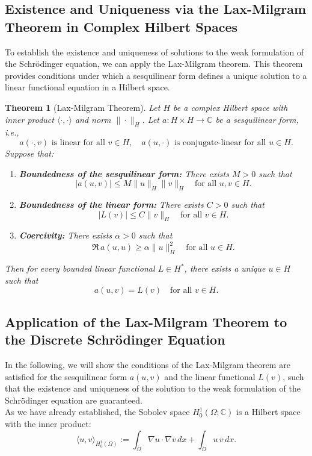 \documentclass{article}
\theoremstyle{definition}
\theoremstyle{plain}
\newtheorem{theorem}[definition]{Theorem}
\theoremstyle{remark}
\begin{document}
\subsection*{Existence and Uniqueness via the Lax-Milgram Theorem in Complex Hilbert Spaces}
To establish the existence and uniqueness of solutions to the weak formulation of the Schrödinger equation, we can apply the Lax-Milgram theorem. 
This theorem provides conditions under which a sesquilinear form defines a unique solution to a linear functional equation in a Hilbert space.
\begin{theorem}
[Lax-Milgram Theorem]
Let $H$ be a complex Hilbert space with inner product $\langle \cdot, \cdot \rangle$ and norm $\| \cdot \|_H$. Let $a : H \times H \to \mathbb{C}$ be a sesquilinear form, i.e.,
\[
a(\cdot, v) \text{ is linear for all } v \in H, \quad a(u, \cdot) \text{ is conjugate-linear for all } u \in H.
\]
Suppose that:
\begin{enumerate}
    \item \textbf{Boundedness of the sesquilinear form:} There exists $M > 0$ such that
    \[
    |a(u, v)| \leq M \|u\|_H \|v\|_H \quad \text{for all } u, v \in H.
    \]
    \item \textbf{Boundedness of the linear form:} There exists $C > 0$ such that
    \[
    |L(v)| \leq C \|v\|_H \quad \text{for all } v \in H.
    \]
    \item \textbf{Coercivity:} There exists $\alpha > 0$ such that
    \[
    \Re \, a(u, u) \geq \alpha \|u\|_H^2 \quad \text{for all } u \in H.
    \]
\end{enumerate}
Then for every bounded linear functional $L \in H^*$, there exists a unique $u \in H$ such that
\[
a(u, v) = L(v) \quad \text{for all } v \in H.
\]
\end{theorem}


\subsection*{Application of the Lax-Milgram Theorem to the Discrete Schrödinger Equation}
In the following, we will show the conditions of the Lax-Milgram theorem are satisfied for the sesquilinear form $a(u, v)$ and the linear functional $L(v)$, such that the existence and uniqueness of the solution to the weak formulation of the Schrödinger equation are guaranteed.\\
As we have already established, the Sobolev space $H_0^1(\Omega; \mathbb{C})$ is a Hilbert space with the inner product:
\[
\langle u, v \rangle_{H_0^1(\Omega)} := \int_\Omega \nabla u \cdot \nabla \overline{v} \, dx + \int_\Omega u \, \overline{v} \, dx.
\]
\end{document}
